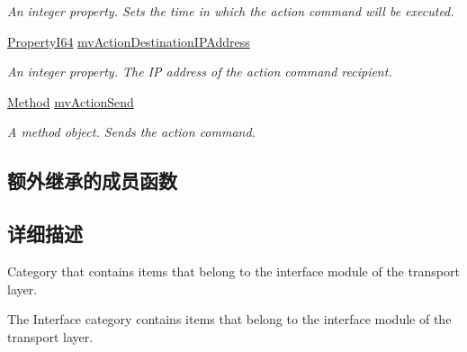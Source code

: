 \begin{DoxyCompactItemize}
\begin{DoxyCompactList}\small\item\em An integer property. Sets the time in which the action command will be executed. \end{DoxyCompactList}\item 
\hyperlink{group___common_interface_ga81749b2696755513663492664a18a893}{Property\+I64} \hyperlink{classmv_i_m_p_a_c_t_1_1acquire_1_1_gen_i_cam_1_1_interface_module_a9daa9251711bc8382a96364984776b7b}{mv\+Action\+Destination\+I\+P\+Address}
\begin{DoxyCompactList}\small\item\em An integer property. The I\+P address of the action command recipient. \end{DoxyCompactList}\item 
\hyperlink{classmv_i_m_p_a_c_t_1_1acquire_1_1_method}{Method} \hyperlink{classmv_i_m_p_a_c_t_1_1acquire_1_1_gen_i_cam_1_1_interface_module_a9c36083fad033a38e3fe8df7e91e3bd2}{mv\+Action\+Send}
\begin{DoxyCompactList}\small\item\em A method object. Sends the action command. \end{DoxyCompactList}\end{DoxyCompactItemize}
\subsection*{额外继承的成员函数}


\subsection{详细描述}
Category that contains items that belong to the interface module of the transport layer. 

The Interface category contains items that belong to the interface module of the transport layer. 

